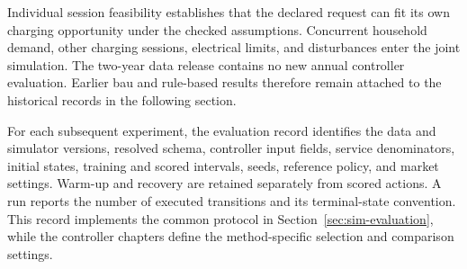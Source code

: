 Individual session feasibility establishes that the declared request can fit its own charging opportunity under the checked assumptions. Concurrent household demand, other charging sessions, electrical limits, and disturbances enter the joint simulation. The two-year data release contains no new annual controller evaluation. Earlier \gls{bau} and rule-based results therefore remain attached to the historical records in the following section.

For each subsequent experiment, the evaluation record identifies the data and simulator versions, resolved schema, controller input fields, service denominators, initial states, training and scored intervals, seeds, reference policy, and market settings. Warm-up and recovery are retained separately from scored actions. A run reports the number of executed transitions and its terminal-state convention. This record implements the common protocol in Section~\ref{sec:sim-evaluation}, while the controller chapters define the method-specific selection and comparison settings.
